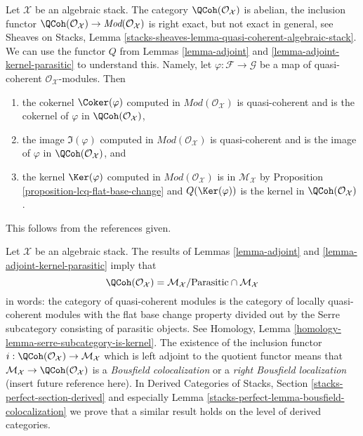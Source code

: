 \begin{remark}
\label{remark-QCoh-abelian}
Let $\mathcal{X}$ be an algebraic stack. The category
$\QCoh(\mathcal{O}_\mathcal{X})$ is abelian, the inclusion functor
$\QCoh(\mathcal{O}_\mathcal{X}) \to \textit{Mod}(\mathcal{O}_\mathcal{X})$
is right exact, but not exact in general, see Sheaves on Stacks, Lemma
\ref{stacks-sheaves-lemma-quasi-coherent-algebraic-stack}.
We can use the functor $Q$ from
Lemmas \ref{lemma-adjoint} and \ref{lemma-adjoint-kernel-parasitic}
to understand this. Namely, let $\varphi : \mathcal{F} \to \mathcal{G}$
be a map of quasi-coherent $\mathcal{O}_\mathcal{X}$-modules. Then
\begin{enumerate}
\item the cokernel $\Coker(\varphi)$ computed in
$\textit{Mod}(\mathcal{O}_\mathcal{X})$ is quasi-coherent and
is the cokernel of $\varphi$ in $\QCoh(\mathcal{O}_\mathcal{X})$,
\item the image $\Im(\varphi)$ computed in
$\textit{Mod}(\mathcal{O}_\mathcal{X})$ is quasi-coherent and
is the image of $\varphi$ in $\QCoh(\mathcal{O}_\mathcal{X})$, and
\item the kernel $\Ker(\varphi)$ computed in
$\textit{Mod}(\mathcal{O}_\mathcal{X})$
is in $\mathcal{M}_\mathcal{X}$
by Proposition \ref{proposition-lcq-flat-base-change} and
$Q(\Ker(\varphi))$ is the kernel in $\QCoh(\mathcal{O}_\mathcal{X})$.
\end{enumerate}
This follows from the references given.
\end{remark}

\begin{remark}
\label{remark-bousfield-colocalization}
Let $\mathcal{X}$ be an algebraic stack. The results of
Lemmas \ref{lemma-adjoint} and \ref{lemma-adjoint-kernel-parasitic}
imply that
$$
\QCoh(\mathcal{O}_\mathcal{X}) =
\mathcal{M}_\mathcal{X} / \text{Parasitic} \cap \mathcal{M}_\mathcal{X}
$$
in words: the category of quasi-coherent modules is the category
of locally quasi-coherent modules with the flat base change property
divided out by the Serre subcategory consisting of parasitic objects.
See Homology, Lemma \ref{homology-lemma-serre-subcategory-is-kernel}.
The existence of the inclusion functor
$i : \QCoh(\mathcal{O}_\mathcal{X}) \to \mathcal{M}_\mathcal{X}$
which is left adjoint to the quotient functor means that
$\mathcal{M}_\mathcal{X} \to \QCoh(\mathcal{O}_\mathcal{X})$
is a {\it Bousfield colocalization} or a {\it right Bousfield localization}
(insert future reference here). In Derived Categories of Stacks, Section
\ref{stacks-perfect-section-derived} and especially
Lemma \ref{stacks-perfect-lemma-bousfield-colocalization}
we prove that a similar result holds on the level of derived categories.
\end{remark}












